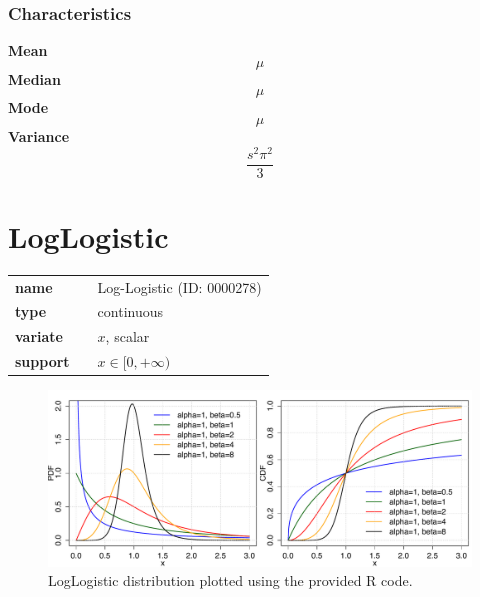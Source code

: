 \subsubsection*{Characteristics}
\smallskip \noindent \hspace{.2cm} \textbf{Mean} 
\begin{equation*}\mu\end{equation*}
\smallskip \noindent \hspace{.2cm} \textbf{Median} 
\begin{equation*}\mu\end{equation*}
\smallskip \noindent \hspace{.2cm} \textbf{Mode} 
\begin{equation*}\mu\end{equation*}
\smallskip \noindent \hspace{.2cm} \textbf{Variance} 
\begin{equation*}\frac{s^2 \pi^2}{3}\end{equation*}
\smallskip

\section*{LogLogistic} 

  \bigskip 

\begin{tabular}{p{2cm}cl}
\textbf{name} & & Log-Logistic (ID: 0000278)\\ 
 
\textbf{type} & & continuous \\ 

\textbf{variate} & & $x$, scalar \\ 

\textbf{support} & & $x \in [0,+\infty)$
\end{tabular}

\begin{figure}[ht!]
\centering
  \includegraphics[width=140mm]{pics/LogLogistic.pdf}
 \caption{LogLogistic distribution plotted using the provided R code.}
 \label{fig:LogLogistic}
\end{figure}

